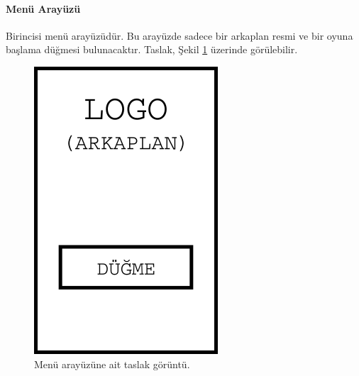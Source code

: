\documentclass[12pt,a4paper]{article}
\begin{document}
   \paragraph{Menü Arayüzü}
   Birincisi menü arayüzüdür. Bu arayüzde sadece bir arkaplan resmi ve bir oyuna başlama düğmesi bulunacaktır. Taslak, Şekil \ref{fig:gm} üzerinde görülebilir.
   \begin{figure}[h!]
      \begin{center}
         \includegraphics{res/gm.png}
         \caption{Menü arayüzüne ait taslak görüntü.}
         \label{fig:gm}
      \end{center}
   \end{figure}
\end{document}
